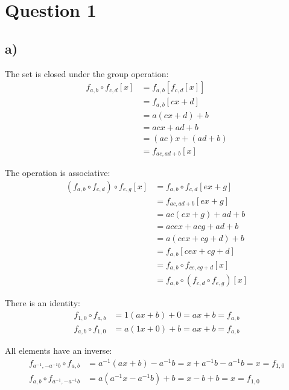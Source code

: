 \documentclass[a4paper,12pt]{article}
\begin{document}
\section*{Question 1}

\subsection*{a)}

The set is closed under the group operation:
\begin{align*}
    f_{a, b} \circ f_{c, d}[x] &= f_{a, b}[f_{c, d}[x]] \\
    &= f_{a, b}[cx + d] \\
    &= a(cx + d) + b \\
    &= acx + ad + b \\
    &= (ac)x + (ad + b) \\
    &= f_{ac, ad + b}[x]
\end{align*}

The operation is associative:
\begin{align*}
    (f_{a,b} \circ f_{c,d}) \circ f_{e, g}[x] &= f_{a,b} \circ f_{c,d}[ex + g] \\
    &= f_{ac, ad + b}[ex + g] \\
    &= ac(ex + g) + ad + b \\
    &= acex + acg + ad + b \\
    &= a(cex + cg + d) + b \\
    &= f_{a,b}[cex + cg + d] \\
    &= f_{a,b} \circ f_{ce, cg + d}[x] \\
    &= f_{a, b} \circ (f_{c, d} \circ f_{e, g})[x]
\end{align*}

There is an identity:
\begin{align*}
    f_{1, 0} \circ f_{a,b} &= 1(ax + b) + 0 = ax + b = f_{a, b} \\
    f_{a, b} \circ f_{1, 0} &= a(1x + 0) + b = ax + b = f_{a, b}
\end{align*}

All elements have an inverse:
\begin{align*}
    f_{a^{-1}, -a^{-1}b} \circ f_{a,b} &= a^{-1}(ax + b) - a^{-1}b = x + a^{-1}b -a^{-1}b = x = f_{1,0} \\
    f_{a, b} \circ f_{a^{-1}, -a^{-1}b} &= a(a^{-1}x - a^{-1}b) + b = x - b + b = x = f_{1, 0}
\end{align*}\\
\end{document}
